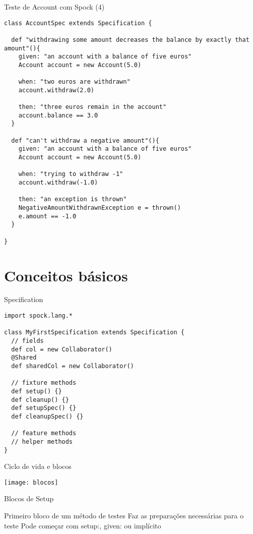 \documentclass{beamer}
\begin{document}
\begin{frame}[fragile]{Teste de Account com Spock (4)}
 \begin{verbatim}
class AccountSpec extends Specification {
  
  def "withdrawing some amount decreases the balance by exactly that amount"(){
    given: "an account with a balance of five euros"
    Account account = new Account(5.0)
    
    when: "two euros are withdrawn"
    account.withdraw(2.0)
    
    then: "three euros remain in the account"
    account.balance == 3.0
  }
  
  def "can't withdraw a negative amount"(){
    given: "an account with a balance of five euros"
    Account account = new Account(5.0)
    
    when: "trying to withdraw -1"
    account.withdraw(-1.0)
    
    then: "an exception is thrown"
    NegativeAmountWithdrawnException e = thrown()
    e.amount == -1.0
  }
  
}
  \end{verbatim}
\end{frame}

\section{Conceitos básicos}

\begin{frame}[fragile]{Specification}
 \begin{verbatim}
import spock.lang.*

class MyFirstSpecification extends Specification {
  // fields
  def col = new Collaborator()
  @Shared
  def sharedCol = new Collaborator()
  
  // fixture methods
  def setup() {}
  def cleanup() {}
  def setupSpec() {}
  def cleanupSpec() {}

  // feature methods
  // helper methods
}
  \end{verbatim}
\end{frame}

\begin{frame}{Ciclo de vida e blocos}
  \begin{center}
    \texttt{[image: blocos]}
  \end{center}
\end{frame}

\begin{frame}{Blocos de Setup}
 \begin{outline}
    Primeiro bloco de um método de testes
    Faz as preparações necessárias para o teste
    Pode começar com \alert{setup:}, \alert{given:} ou implícito
 \end{outline}
\end{frame}
\end{document}
